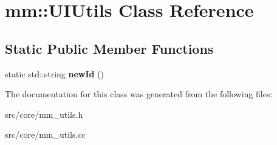 \hypertarget{classmm_1_1_u_i_utils}{}\section{mm\+:\+:U\+I\+Utils Class Reference}
\label{classmm_1_1_u_i_utils}
\subsection*{Static Public Member Functions}
\begin{DoxyCompactItemize}
\item 
\hypertarget{classmm_1_1_u_i_utils_a92e33cb16722f177516889e563024358}{}static std\+::string {\bfseries new\+Id} ()\label{classmm_1_1_u_i_utils_a92e33cb16722f177516889e563024358}

\end{DoxyCompactItemize}


The documentation for this class was generated from the following files\+:\begin{DoxyCompactItemize}
\item 
src/core/mm\+\_\+utils.\+h\item 
src/core/mm\+\_\+utils.\+cc\end{DoxyCompactItemize}
